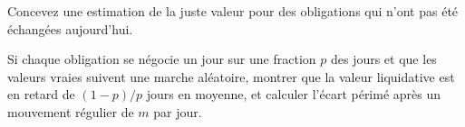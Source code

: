 \begin{interviewq}\label{iq:s2:systematic-credit-and-bond-etf-arbitrage:5}
Concevez une estimation de la juste valeur pour des obligations qui n'ont pas été échangées aujourd'hui.
\end{interviewq}

\begin{interviewq}\label{iq:s2:systematic-credit-and-bond-etf-arbitrage:6}
Si chaque obligation se négocie un jour sur une fraction $p$ des jours et que les valeurs vraies suivent une marche aléatoire, montrer que la valeur liquidative est en retard de $(1 - p)/p$ jours en moyenne,
et calculer l'écart périmé après un mouvement régulier de $m$ par jour.
\end{interviewq}
